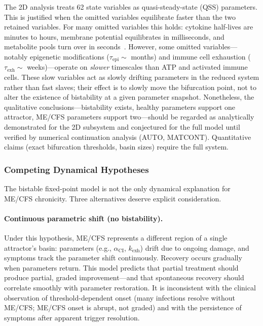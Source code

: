 \begin{limitation}
\label{lim:qss-reduction}
The 2D analysis treats 62 state variables as quasi-steady-state (QSS) parameters. This is justified when the omitted variables equilibrate faster than the two retained variables. For many omitted variables this holds: cytokine half-lives are minutes to hours, membrane potential equilibrates in milliseconds, and metabolite pools turn over in seconds~\cite{Eissing2011}. However, some omitted variables---notably epigenetic modifications ($\tau_{\text{epi}} \sim$ months) and immune cell exhaustion ($\tau_{\text{exh}} \sim$ weeks)---operate on \emph{slower} timescales than ATP and activated immune cells. These slow variables act as slowly drifting parameters in the reduced system rather than fast slaves; their effect is to slowly move the bifurcation point, not to alter the existence of bistability at a given parameter snapshot. Nonetheless, the qualitative conclusions---bistability exists, healthy parameters support one attractor, ME/CFS parameters support two---should be regarded as analytically demonstrated for the 2D subsystem and conjectured for the full model until verified by numerical continuation analysis (AUTO, MATCONT). Quantitative claims (exact bifurcation thresholds, basin sizes) require the full system.
\end{limitation}

\subsubsection{Competing Dynamical Hypotheses}
\label{sec:competing-hypotheses}

The bistable fixed-point model is not the only dynamical explanation for ME/CFS chronicity. Three alternatives deserve explicit consideration.

\paragraph{Continuous parametric shift (no bistability).} Under this hypothesis, ME/CFS represents a different region of a single attractor's basin: parameters (e.g., $\alpha_{\text{CI}}$, $k_{\text{exh}}$) drift due to ongoing damage, and symptoms track the parameter shift continuously. Recovery occurs gradually when parameters return. This model predicts that partial treatment should produce partial, graded improvement---and that spontaneous recovery should correlate smoothly with parameter restoration. It is inconsistent with the clinical observation of threshold-dependent onset (many infections resolve without ME/CFS; ME/CFS onset is abrupt, not graded) and with the persistence of symptoms after apparent trigger resolution.

